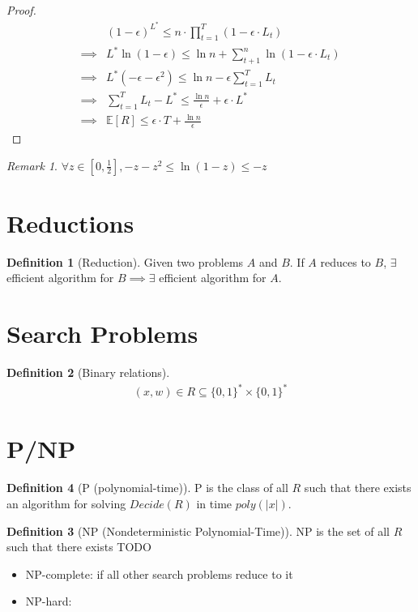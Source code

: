 \documentclass[11pt]{article}
\theoremstyle{definition}
\newtheorem{definition}{Definition}[section]
\theoremstyle{remark}
\newtheorem*{remark}{Remark}
\begin{document}
\begin{proof}
\begin{align*}
& (1-\epsilon)^{L^*} \leq n \cdot \prod_{t=1}^{T} (1 - \epsilon \cdot L_t) \\ 
\implies & L^* \ln (1-\epsilon) \leq \ln n + \sum _{t+1}^n \ln (1 - \epsilon \cdot L_t) \\
\implies & L^* (-\epsilon-\epsilon^2) \leq \ln n - \epsilon \sum_{t=1}^T L_t \\
\implies & \sum_{t=1}^T L_t - L^* \leq \frac{\ln n}{\epsilon} + \epsilon \cdot L^* \\
\implies & \mathbb{E}[R] \leq \epsilon \cdot T + \frac{\ln n}{\epsilon}
\end{align*}
\end{proof}

\begin{remark} $\forall z \in [0,\frac{1}{2}], -z-z^2 \leq \ln (1-z) \leq -z$
\end{remark}
\clearpage

\section{Reductions}
\begin{definition}[Reduction]
Given two problems $A$ and $B$. If $A$ reduces to $B$, $\exists$ efficient algorithm for $B \implies \exists$ efficient algorithm for $A$.
\end{definition}

\clearpage

\section{Search Problems}
\begin{definition}[Binary relations]
\begin{align*}
(x,w) \in R \subseteq \{ 0,1 \}^* \times \{ 0,1 \}^*
\end{align*}
\end{definition}

\section{P/NP}
\begin{definition}[P (polynomial-time)] P  is the class of all $R$ such that there exists an algorithm for solving $Decide(R)$ in time $poly(|x|)$.

\begin{definition}[NP (Nondeterministic Polynomial-Time)] NP is the set of all $R$ such that there exists TODO
\end{definition}

\begin{itemize}
\item NP-complete: if all other search problems reduce to it
\item NP-hard: 
\end{itemize}

\end{definition}
\clearpage
\end{document}
